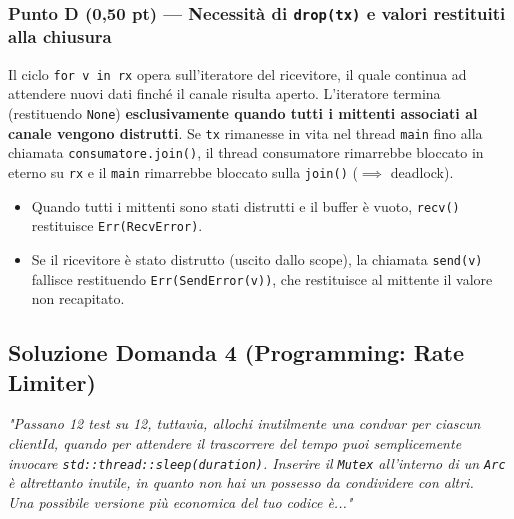 \documentclass[11pt,a4paper]{article}
\begin{document}
\subsubsection*{Punto D (0,50 pt) --- Necessità di \texttt{drop(tx)} e valori restituiti alla chiusura}
Il ciclo \texttt{for v in rx} opera sull'iteratore del ricevitore, il quale continua ad attendere nuovi dati finché il canale risulta aperto. L'iteratore termina (restituendo \texttt{None}) \textbf{esclusivamente quando tutti i mittenti associati al canale vengono distrutti}. Se \texttt{tx} rimanesse in vita nel thread \texttt{main} fino alla chiamata \texttt{consumatore.join()}, il thread consumatore rimarrebbe bloccato in eterno su \texttt{rx} e il \texttt{main} rimarrebbe bloccato sulla \texttt{join()} ($\implies$ deadlock).
\begin{itemize}[leftmargin=1.5em]
    \item Quando tutti i mittenti sono stati distrutti e il buffer è vuoto, \texttt{recv()} restituisce \texttt{Err(RecvError)}.
    \item Se il ricevitore è stato distrutto (uscito dallo scope), la chiamata \texttt{send(v)} fallisce restituendo \texttt{Err(SendError(v))}, che restituisce al mittente il valore non recapitato.
\end{itemize}

\newpage
\subsection{Soluzione Domanda 4 (Programming: Rate Limiter)}

\begin{tcolorbox}[colback=feedbackbg,colframe=feedbackborder,title=\textbf{Feedback Ufficiale della Commissione (Prof. Malnati)},arc=3mm]
\textit{"Passano 12 test su 12, tuttavia, allochi inutilmente una condvar per ciascun clientId, quando per attendere il trascorrere del tempo puoi semplicemente invocare \texttt{std::thread::sleep(duration)}. Inserire il \texttt{Mutex} all'interno di un \texttt{Arc} è altrettanto inutile, in quanto non hai un possesso da condividere con altri.\\
Una possibile versione più economica del tuo codice è..."}
\end{tcolorbox}
\end{document}

